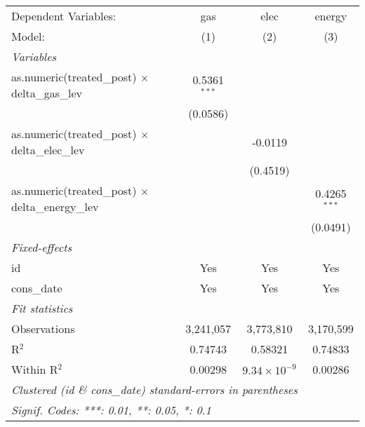 
\begin{tabular}{lccc}
   \tabularnewline\midrule\midrule
   Dependent Variables:                                      & gas            & elec                  & energy\\
   Model:                                                    & (1)            & (2)                   & (3)\\
   \midrule \emph{Variables} &   &   &  \\
   as.numeric(treated\_post) $\times$ delta\_gas\_lev    & 0.5361$^{***}$ &                       &   \\
                                                             & (0.0586)       &                       &   \\
   as.numeric(treated\_post) $\times$ delta\_elec\_lev   &                & -0.0119               &   \\
                                                             &                & (0.4519)              &   \\
   as.numeric(treated\_post) $\times$ delta\_energy\_lev &                &                       & 0.4265$^{***}$\\
                                                             &                &                       & (0.0491)\\
   \midrule \emph{Fixed-effects} &   &   &  \\
   id                                                        & Yes            & Yes                   & Yes\\
   cons\_date                                               & Yes            & Yes                   & Yes\\
   \midrule \emph{Fit statistics} &   &   &  \\
   Observations                                              & 3,241,057      & 3,773,810             & 3,170,599\\
   R$^2$                                                     & 0.74743        & 0.58321               & 0.74833\\
   Within R$^2$                                              & 0.00298        & $9.34\times 10^{-9}$ & 0.00286\\
   \midrule\midrule\multicolumn{4}{l}{\emph{Clustered (id \& cons\_date) standard-errors in parentheses}}\\
   \multicolumn{4}{l}{\emph{Signif. Codes: ***: 0.01, **: 0.05, *: 0.1}}\\
\end{tabular}


